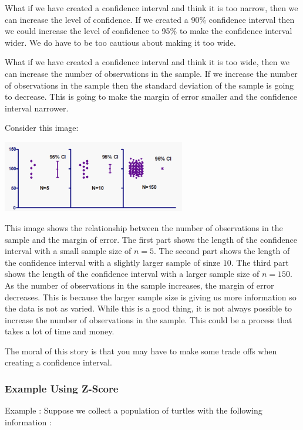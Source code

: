 \documentclass[
  letterpaper,
  DIV=11,
  numbers=noendperiod]{scrreprt}
\begin{document}
What if we have created a confidence interval and think it is too
narrow, then we can increase the level of confidence. If we created a
90\% confidence interval then we could increase the level of confidence
to 95\% to make the confidence interval wider. We do have to be too
cautious about making it too wide.

What if we have created a confidence interval and think it is too wide,
then we can increase the number of observations in the sample. If we
increase the number of observations in the sample then the standard
deviation of the sample is going to decrease. This is going to make the
margin of error smaller and the confidence interval narrower.

Consider this image:

\includegraphics[width=0.6\textwidth,height=\textheight]{./images/EPCI_3.jpg}

This image shows the relationship between the number of observations in
the sample and the margin of error. The first part shows the length of
the confidence interval with a small sample size of \(n=5\). The second
part shows the length of the confidence interval with a slightly larger
sample of sinze \(10\). The third part shows the length of the
confidence interval with a larger sample size of \(n=150\). As the
number of observations in the sample increases, the margin of error
decreases. This is because the larger sample size is giving us more
information so the data is not as varied. While this is a good thing, it
is not always possible to increase the number of observations in the
sample. This could be a process that takes a lot of time and money.

The moral of this story is that you may have to make some trade offs
when creating a confidence interval.

\subsubsection*{Example Using Z-Score}\label{example-using-z-score}

Example : Suppose we collect a population of turtles with the following
information :
\end{document}
